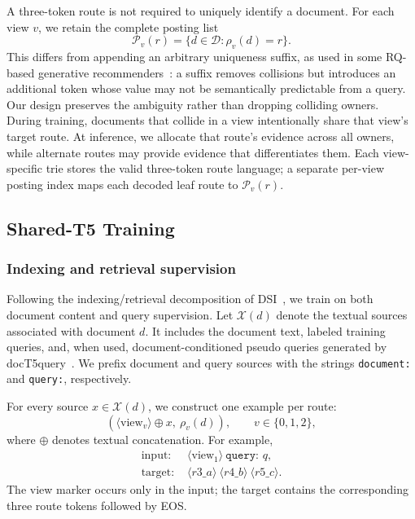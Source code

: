 A three-token route is not required to uniquely identify a document. For each view $v$, we retain the complete posting list
\begin{equation}
    \mathcal{P}_v(r)=\{d\in\mathcal{D}:\rho_v(d)=r\}.
\end{equation}
This differs from appending an arbitrary uniqueness suffix, as used in some RQ-based generative recommenders~\citep{tiger2023}: a suffix removes collisions but introduces an additional token whose value may not be semantically predictable from a query. Our design preserves the ambiguity rather than dropping colliding owners. During training, documents that collide in a view intentionally share that view's target route. At inference, we allocate that route's evidence across all owners, while alternate routes may provide evidence that differentiates them. Each view-specific trie stores the valid three-token route language; a separate per-view posting index maps each decoded leaf route to $\mathcal{P}_v(r)$.

\subsection{Shared-T5 Training}
\label{sec:shared-training}

\subsubsection{Indexing and retrieval supervision}

Following the indexing/retrieval decomposition of DSI~\citep{tay2022dsi}, we train on both document content and query supervision. Let $\mathcal{X}(d)$ denote the textual sources associated with document $d$. It includes the document text, labeled training queries, and, when used, document-conditioned pseudo queries generated by docT5query~\citep{nogueira2019doct5query}. We prefix document and query sources with the strings \texttt{document:} and \texttt{query:}, respectively.

For every source $x\in\mathcal{X}(d)$, we construct one example per route:
\begin{equation}
    \left(\langle\mathrm{view}_v\rangle\oplus x,\ \rho_v(d)\right),
    \qquad v\in\{0,1,2\},
\end{equation}
where $\oplus$ denotes textual concatenation. For example,
\begin{align*}
    \text{input: }&\langle\mathrm{view}_1\rangle\ \texttt{query: }q,\\
    \text{target: }&\langle r3\_a\rangle\ \langle r4\_b\rangle\ \langle r5\_c\rangle.
\end{align*}
The view marker occurs only in the input; the target contains the corresponding three route tokens followed by EOS.

